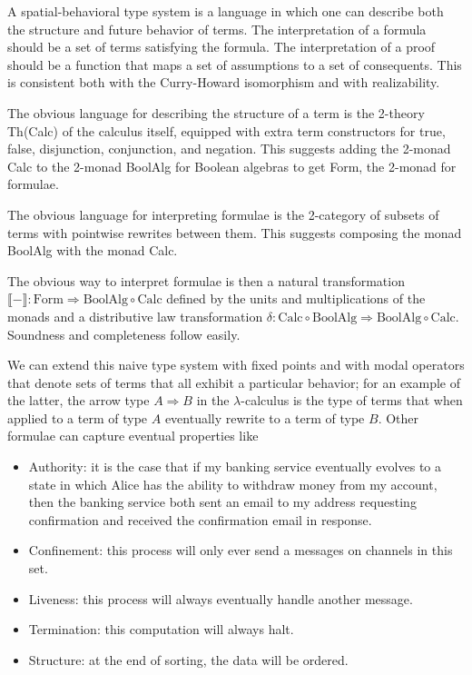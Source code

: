 \documentclass{llncs}
\newcommand{\interp}[1]{\llbracket #1 \rrbracket}
\newcommand{\maps}{\colon}
\newcommand{\Calc}{\mathrm{Calc}}
\newcommand{\BoolAlg}{\mathrm{BoolAlg}}
\renewcommand{\Form}{\mathrm{Form}}
\begin{document}
  A spatial-behavioral type system is a language in which one can describe both the structure and future behavior of terms.  The interpretation of a formula should be a set of terms satisfying the formula.  The interpretation of a proof should be a function that maps a set of assumptions to a set of consequents.  This is consistent both with the Curry-Howard isomorphism and with realizability.

  The obvious language for describing the structure of a term is the 2-theory Th(Calc) of the calculus itself, equipped with extra term constructors for true, false, disjunction, conjunction, and negation.  This suggests adding the 2-monad Calc to the 2-monad BoolAlg for Boolean algebras to get Form, the 2-monad for formulae.

  The obvious language for interpreting formulae is the 2-category of subsets of terms with pointwise rewrites between them.  This suggests composing the monad BoolAlg with the monad Calc.

  The obvious way to interpret formulae is then a natural transformation $\interp{-} \maps \Form \Rightarrow \BoolAlg \circ \Calc$ defined by the units and multiplications of the monads and a distributive law transformation $\delta\maps \Calc \circ \BoolAlg \Rightarrow \BoolAlg \circ \Calc.$  Soundness and completeness follow easily.

  We can extend this naive type system with fixed points and with modal operators that denote sets of terms that all exhibit a particular behavior; for an example of the latter, the arrow type $A \Rightarrow B$ in the $\lambda$-calculus is the type of terms that when applied to a term of type $A$ eventually rewrite to a term of type $B$.  Other formulae can capture eventual properties like
\begin{itemize}
  \item Authority: it is the case that if my banking service eventually evolves to a state in which Alice has the ability to withdraw money from my account, then the banking service both sent an email to my address requesting confirmation and received the confirmation email in response.
  \item Confinement: this process will only ever send a messages on channels in this set.
  \item Liveness: this process will always eventually handle another message.
  \item Termination: this computation will always halt.
  \item Structure: at the end of sorting, the data will be ordered.
\end{itemize}
\end{document}
